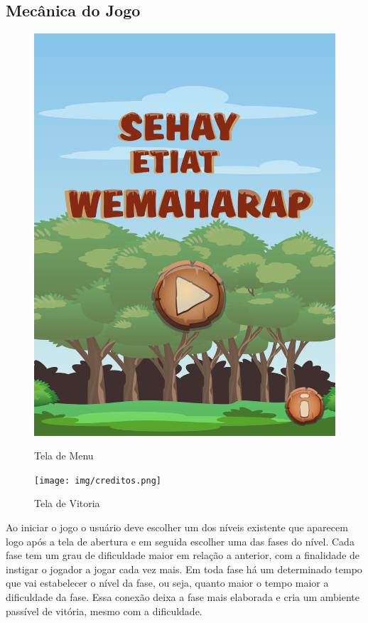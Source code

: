 \documentclass[12pt]{article}
\begin{document}
	
	\subsection{Mecânica do Jogo}
\begin{figure}[!htb]
	\centering
	\includegraphics[width=\linewidth]{img/menu.png}
	\caption{Tela de Menu}\label{fig:menu}
	\endminipage \hspace{0.5cm}
	\texttt{[image: img/creditos.png]}
	\caption{Tela de Vitoria}\label{fig:creditos}
	\endminipage
\end{figure}
		Ao iniciar o jogo o usuário deve escolher um dos níveis existente que aparecem logo após a tela de abertura e em seguida escolher uma das fases do nível. Cada fase tem um grau de dificuldade maior em relação a anterior, com a finalidade de instigar o jogador a jogar cada vez mais. Em toda fase há um determinado tempo que vai estabelecer o nível da fase, ou seja, quanto maior o tempo maior a dificuldade da fase. Essa conexão deixa a fase mais elaborada e cria um ambiente passível de vitória, mesmo com a dificuldade. 
		
\end{document}
